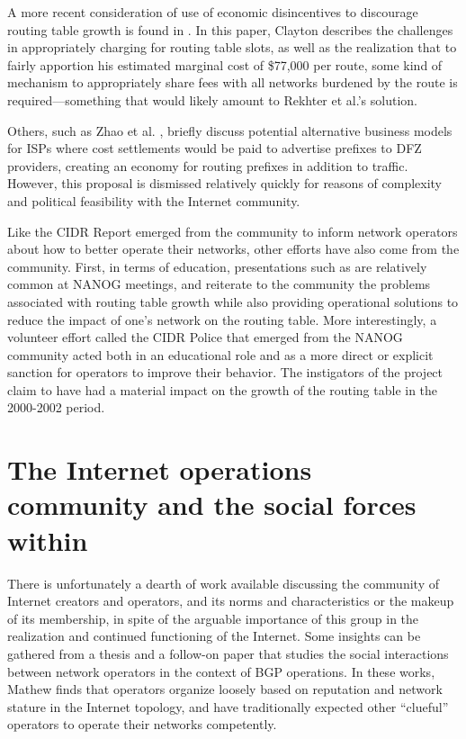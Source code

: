 A more recent consideration of use of economic disincentives to discourage routing table growth is found in \cite{Clayton:2010bh}. In this paper, Clayton describes the challenges in appropriately charging for routing table slots, as well as the realization that to fairly apportion his estimated marginal cost of \$77,000 per route, some kind of mechanism to appropriately share fees with all networks burdened by the route is required---something that would likely amount to Rekhter et al.'s solution. 

Others, such as Zhao et al. \cite{Zhao:2001ly}, briefly discuss potential alternative business models for ISPs where cost settlements would be paid to advertise prefixes to DFZ providers, creating an economy for routing prefixes in addition to traffic. However, this proposal is dismissed relatively quickly for reasons of complexity and political feasibility with the Internet community.

Like the CIDR Report emerged from the community to inform network operators about how to better operate their networks, other efforts have also come from the community. First, in terms of education, presentations such as \cite{Steenbergen:2010nx} are relatively common at NANOG meetings, and reiterate to the community the problems associated with routing table growth while also providing operational solutions to reduce the impact of one's network on the routing table.  More interestingly, a volunteer effort called the CIDR Police \cite{Nussbacher:2003ys} that emerged from the NANOG community acted both in an educational role and as a more direct or explicit sanction for operators to improve their behavior. The instigators of the project claim to have had a material impact on the growth of the routing table in the 2000-2002 period.

\section{The Internet operations community and the social forces within}

There is unfortunately a dearth of work available discussing the community of Internet creators and operators, and its norms and characteristics or the makeup of its membership, in spite of the arguable importance of this group in the realization and continued functioning of the Internet. Some insights can be gathered from a thesis \cite{Mathew:2009dz} and a follow-on paper \cite{Mathew:2010ly} that studies the social interactions between network operators in the context of BGP operations. In these works, Mathew finds that operators organize loosely based on reputation and network stature in the Internet topology, and have traditionally expected other ``clueful'' operators to operate their networks competently.

